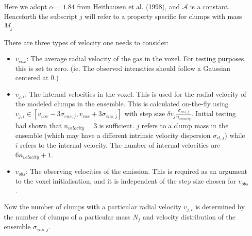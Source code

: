 \documentclass[a4paper]{article}
\newcommand{\kosmatau}{KOSMA-\(\tau\)}
\begin{document}
    Here we adopt \(\alpha=1.84\) from Heithausen et al. (1998), and \(\mathcal{A}\) is a constant.
    Henceforth the subscript \(j\) will refer to a property specific for clumps with mass \(M_j\).

    There are three types of velocity one needs to consider:

    \begin{itemize}
        \item \(v_{vox}\): The average radial velocity of the gas in the voxel. For testing purposes, this is set to zero. (ie. The observed intensities should follow a Gaussian centered at 0.)
        \item \(v_{j,i}\): The internal velocities in the voxel. This is used for the radial velocity of the modeled clumps in the ensemble. This is calculated on-the-fly using \(v_{j,i} \in [v_{vox} - 3 \sigma_{ens,j}, v_{vox} + 3 \sigma_{ens,j}]\) with step size \(\delta v_{j}\frac{\sigma_{ens,j}}{n_{velocity}}\). Initial testing had shown that \(n_{velocity} = 3\) is sufficient. \(j\) refers to a clump mass in the ensemble (which may have a different intrinsic velocity dispersion \(\sigma_{cl,j}\)) while \(i\) refers to the internal velocity. The number of internal velocities are \(6 n_{velocity} + 1\).
        \item \(v_{obs}\): The observing velocities of the emission. This is required as an argument to the voxel initialisation, and it is independent of the step size chosen for \(v_{obs}\).
    \end{itemize}

    Now the number of clumps with a particular radial velocity \(v_{j,i}\) is determined by the number of clumps of a particular mass \(N_j\) and velocity distribution of the ensemble \(\sigma_{ens,j}\).
\end{document}
